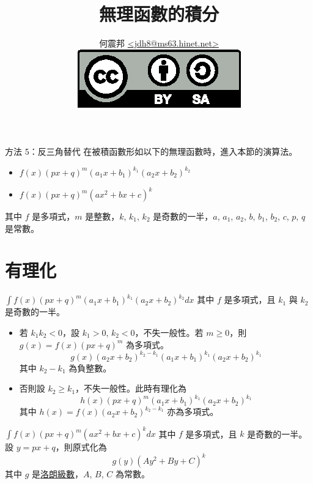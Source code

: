 \documentclass{beamer}
\title[積分無理函數]{無理函數的積分}
\author[何震邦]{何震邦 \href{mailto:jdh8@ms63.hinet.net}{\textless jdh8@ms63.hinet.net\textgreater}\\
    \href{http://creativecommons.org/licenses/by-sa/3.0/tw/deed.zh\textunderscore TW}{\includegraphics{by-sa.eps}}}
\theoremstyle{remark}
\begin{document}
\begin{CJK}{UTF8}{bsmi}
\maketitle

\begin{frame}{方法 5：反三角替代}
  在被積函數形如以下的無理函數時，進入本節的演算法。
  \begin{itemize}
    \item $f(x) \left( px + q \right)^m \left( a_1 x + b_1 \right)^{k_1} \left( a_2 x + b_2 \right)^{k_2}$
    \item $f(x) \left( px + q \right)^m \left( ax^2 + bx + c \right)^k$
  \end{itemize}
  其中 $f$ 是多項式，$m$ 是整數，$k$, $k_1$, $k_2$ 是奇數的一半，$a$, $a_1$, $a_2$, $b$, $b_1$, $b_2$, $c$, $p$, $q$
  是常數。
\end{frame}

\section{有理化}
\begin{frame}{$\displaystyle \int f(x) \left( px + q \right)^m \left( a_1 x + b_1 \right)^{k_1}
    \left( a_2 x + b_2 \right)^{k_2} dx$}
  其中 $f$ 是多項式，且 $k_1$ 與 $k_2$ 是奇數的一半。
  \begin{itemize}
    \item 若 $k_1 k_2 < 0$，設 $k_1 > 0$, $k_2 < 0$，不失一般性。若 $m \ge 0$，則 $g(x) = f(x) \left( px + q \right)^m$
      為多項式。
      \[g(x) \left( a_2 x + b_2 \right)^{k_2 - k_1} \left( a_1 x + b_1 \right)^{k_1} \left( a_2 x + b_2 \right)^{k_1}\]
      其中 $k_2 - k_1$ 為負整數。
    \item 否則設 $k_2 \ge k_1$，不失一般性。此時有理化為
      \[h(x) \left( px + q \right)^m \left( a_1 x + b_1 \right)^{k_1} \left( a_2 x + b_2 \right)^{k_1}\]
      其中 $h(x) = f(x)  \left( a_2 x + b_2 \right)^{k_2-k_1}$ 亦為多項式。
  \end{itemize}
\end{frame}

\begin{frame}{$\displaystyle \int f(x) \left( px + q \right)^m \left( ax^2 + bx + c \right)^k dx$}
  其中 $f$ 是多項式，且 $k$ 是奇數的一半。設 $y = px + q$，則原式化為
  \[g(y) \left( Ay^2 + By + C \right)^k\]
  其中 $g$ 是\href{http://zh.wikipedia.org/wiki/\%E6\%B4\%9B\%E6\%9C\%97\%E7\%BA\%A7\%E6\%95\%B0}{洛朗級數}，$A$, $B$, $C$
  為常數。
\end{frame}


\end{CJK}
\end{document}
